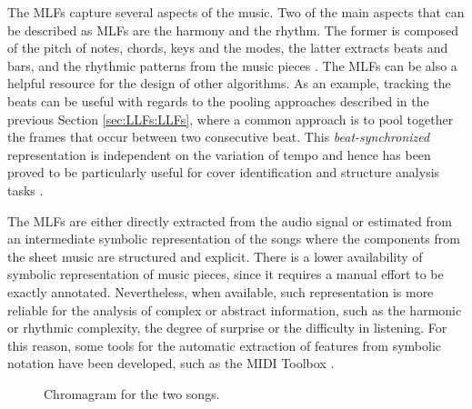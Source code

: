 The MLFs capture several aspects of the music. Two of the main aspects that can be described as MLFs are the harmony and the rhythm. The former is composed of the pitch of notes, chords, keys and the modes, the latter extracts beats and bars, and the rhythmic patterns from the music pieces \cite{muller2007information,muller2015fundamentals,bello2010identifying,Nieto2D}. The MLFs can be %
also a helpful resource for the design of other algorithms. %
As an example, tracking the beats can be useful with regards to the pooling approaches described in the previous Section \ref{sec:LLFs:LLFs}, where a common approach is to pool together the frames that occur between two consecutive beat. This \textit{beat-synchronized} representation is independent on the variation of tempo and hence has been proved to be particularly useful for cover identification and structure analysis tasks \cite{Ellis2007,Nieto2D}.

The MLFs are either directly extracted from the audio signal or estimated from an intermediate symbolic representation of the songs where the components from the sheet music %
are structured and explicit. %
There is a lower availability of symbolic representation of music pieces, since it requires a manual effort to be exactly annotated. Nevertheless, when available, such representation %
is more reliable for the analysis of complex or abstract information, such as the harmonic or rhythmic complexity, the degree of surprise or the difficulty in listening. For this reason, some tools for the automatic extraction of features from symbolic notation have been developed, such as the MIDI Toolbox \cite{Eerola2004}.


\begin{figure}[tb]
	\centering
	 \hfil
	\caption{Chromagram for the two songs.}
	\label{fig:LLFs:chroma}          
\end{figure}



